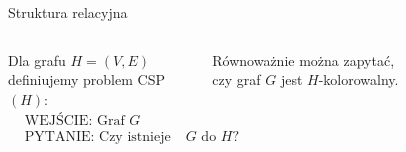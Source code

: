 \begin{frame}{Struktura relacyjna}

\begin{columns}

    Dla grafu \(H=(V,E)\) definiujemy problem CSP\((H)\):
    \begin{align*}
        & \text{WEJŚCIE: Graf } G \\
        & \text{PYTANIE: Czy istnieje homomorfizm z } G \text{ do } H?
    \end{align*}

    \vspace{1em}
    Równoważnie można zapytać, czy graf \(G\) jest \(H\)-kolorowalny.

    \begin{figure}
        \centering
        
    \end{figure}
\end{columns}
\vspace{3em}

\end{frame}